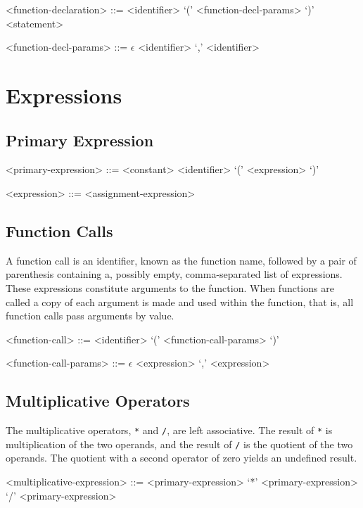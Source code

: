 \documentclass[letterpaper]{article}
\begin{document}
\begin{grammar}
<function-declaration> ::= <identifier> `(' <function-decl-params> `)' <statement> 

<function-decl-params> ::= $\epsilon$
\alt <identifier>
 `,' <identifier>
\end{grammar}

\section{Expressions}
\label{sec:expressions}

\subsection{Primary Expression}

\begin{grammar}
<primary-expression> ::= <constant>
\alt <identifier>
\alt `(' <expression> `)'

<expression> ::= <assignment-expression>
\end{grammar}

\subsection{Function Calls}
A function call is an identifier, known as the function name, followed by a pair of parenthesis containing a, possibly empty, comma-separated list of expressions.  These expressions constitute arguments to the function.  When functions are called a copy of each argument is made and used within the function, that is, all function calls pass arguments by value.
\begin{grammar}
<function-call> ::= <identifier> `(' <function-call-params> `)'

<function-call-params> ::= $\epsilon$
\alt <expression>
 `,' <expression>
\end{grammar}

\subsection{Multiplicative Operators}
The multiplicative operators, \texttt{*} and \texttt{/}, are left associative.  The result of \texttt{*} is multiplication of the two operands, and the result of \texttt{/} is the quotient of the two operands.  The quotient with a second operator of zero yields an undefined result.
\begin{grammar}
<multiplicative-expression> ::= <primary-expression>
 `*' <primary-expression>
 `/' <primary-expression>
\end{grammar}
\end{document}
